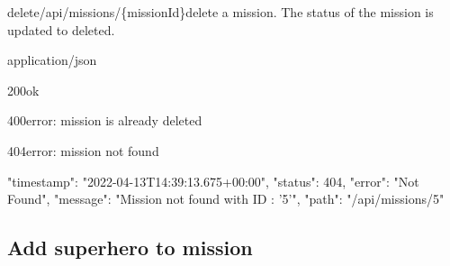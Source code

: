 \begin{apiRoute}{delete}{/api/missions/\{missionId\}}{delete a mission. The status of the mission is updated to deleted.}
	\begin{routeParameter}
	\end{routeParameter}
	\begin{routeResponse}{application/json}
		\begin{routeResponseItem}{200}{ok}
		\end{routeResponseItem}
		\begin{routeResponseItem}{400}{error: mission is already deleted}
		\end{routeResponseItem}
	\begin{routeResponseItem}{404}{error: mission not found}
			\begin{routeResponseItemBody}
{
	"timestamp": "2022-04-13T14:39:13.675+00:00",
	"status": 404,
	"error": "Not Found",
	"message": "Mission not found with ID : '5'",
	"path": "/api/missions/5"
}
			\end{routeResponseItemBody}
		\end{routeResponseItem}
	\end{routeResponse}
\end{apiRoute}

\subsection{Add superhero to mission}


